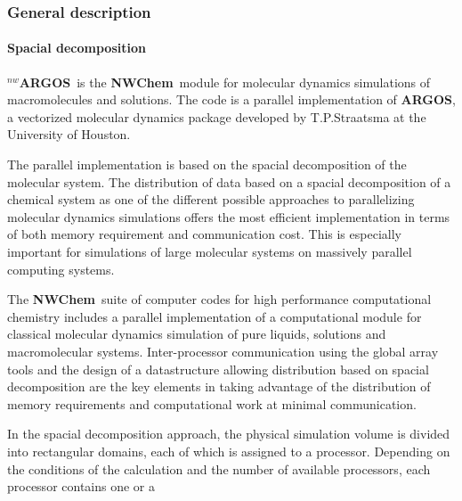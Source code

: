\newcommand{\mc}[3]{\multicolumn{#1}{#2}{#3}}
\newcommand{\vb}[1]{\mbox{\verb.#1.}}
\newcommand{\none}{\multicolumn{2}{|c|}{ }}
\renewcommand{\thetable}{\Roman{table}}
\newcommand{\mcc}[1]{\multicolumn{2}{c}{#1}}
\def\bmu{\mbox{\boldmath $\mu$}}
\def\bE{\mbox{\bf E}}
\def\br{\mbox{\bf r}}
\def\tT{\tilde{T}}
\def\t{\tilde{1}}
\def\ip{i\prime}
\def\jp{j\prime}
\def\ipp{i\prime\prime}
\def\jpp{j\prime\prime}
\def\etal{{\sl et al.}}
\def\nwchem{{\bf NWChem}}
\def\nwargos{{\bf $^{nw}$ARGOS}}
\def\nwtop{{\bf $^{nw}$TOP}}
\def\nwrst{{\bf $^{nw}$RST}}
\def\nwsgm{{\bf $^{nw}$SGM}}
\def\argos{{\bf ARGOS}}
\subsubsection{General description}
\paragraph{Spacial decomposition}
\nwargos\  is the \nwchem\  module for molecular dynamics
simulations of macromolecules and solutions. The code is a parallel
implementation of \argos, a vectorized molecular dynamics
package developed by T.P.Straatsma at the University of Houston.
\par
The parallel implementation is based on the spacial decomposition of 
the molecular system.
The distribution of data based on a spacial decomposition of a
chemical system as one of the different possible approaches to
parallelizing molecular dynamics simulations offers the most
efficient implementation in terms of both memory requirement and
communication cost. This is especially important for simulations
of large molecular systems on massively parallel computing systems.
\par
The \nwchem\  suite of computer codes for high performance computational 
chemistry includes a parallel implementation of a computational
module for classical molecular dynamics simulation of pure liquids,
solutions and macromolecular systems.
Inter-processor communication using the global array tools and the
design of a datastructure allowing distribution based on spacial
decomposition are the key elements in taking advantage of
the distribution of memory requirements and computational work at
minimal communication.
\par
In the spacial decomposition approach, the physical simulation
volume is divided into rectangular domains, each of which is
assigned to a processor.
Depending on the conditions of the calculation and the
number of available processors, each processor contains one or a
